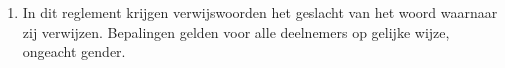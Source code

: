 
\begin{enumerate}
\item In dit reglement krijgen verwijswoorden het geslacht van het woord waarnaar zij verwijzen. Bepalingen gelden voor alle deelnemers op gelijke wijze, ongeacht gender.
\end{enumerate}